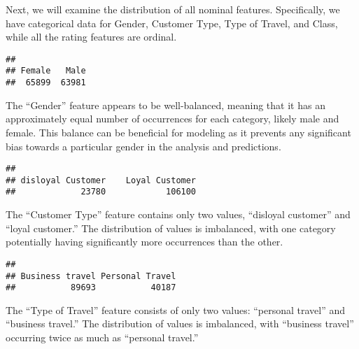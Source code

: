 \documentclass[
]{article}
\newenvironment{Shaded}{\begin{snugshade}}{\end{snugshade}}
\newcommand{\FunctionTok}[1]{\textcolor[rgb]{0.13,0.29,0.53}{\textbf{#1}}}
\newcommand{\NormalTok}[1]{#1}
\newcommand{\SpecialCharTok}[1]{\textcolor[rgb]{0.81,0.36,0.00}{\textbf{#1}}}
\begin{document}
Next, we will examine the distribution of all nominal features.
Specifically, we have categorical data for Gender, Customer Type, Type
of Travel, and Class, while all the rating features are ordinal.

\begin{Shaded}
\end{Shaded}

\begin{verbatim}
## 
## Female   Male 
##  65899  63981
\end{verbatim}

The ``Gender'' feature appears to be well-balanced, meaning that it has
an approximately equal number of occurrences for each category, likely
male and female. This balance can be beneficial for modeling as it
prevents any significant bias towards a particular gender in the
analysis and predictions.

\begin{Shaded}
\end{Shaded}

\begin{verbatim}
## 
## disloyal Customer    Loyal Customer 
##             23780            106100
\end{verbatim}

The ``Customer Type'' feature contains only two values, ``disloyal
customer'' and ``loyal customer.'' The distribution of values is
imbalanced, with one category potentially having significantly more
occurrences than the other.

\begin{Shaded}
\end{Shaded}

\begin{verbatim}
## 
## Business travel Personal Travel 
##           89693           40187
\end{verbatim}

The ``Type of Travel'' feature consists of only two values: ``personal
travel'' and ``business travel.'' The distribution of values is
imbalanced, with ``business travel'' occurring twice as much as
``personal travel.''
\end{document}
